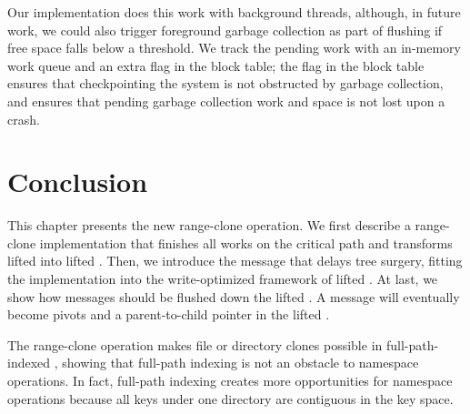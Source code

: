 Our \bedag implementation does this work with background threads,
although, in future work, we could also trigger foreground garbage collection
as part of flushing if free space falls below a threshold.
We track the pending work with an in-memory work queue and an extra flag in the block table;
the flag in the block table ensures that checkpointing the system is not obstructed by garbage collection,
and ensures that pending garbage collection work and space is not lost upon a crash.

\section{Conclusion}

This chapter presents the new range-clone operation.
We first describe a range-clone implementation that finishes all works
on the critical path and transforms lifted \bets into lifted \bedags.
Then, we introduce the \goto message that delays tree surgery,
fitting the implementation into the write-optimized framework of lifted \bedags.
At last, we show how \goto messages should be flushed down the lifted \bedags.
A \goto message will eventually become pivots and a parent-to-child pointer
in the lifted \bedag.

The range-clone operation makes file or directory clones possible in
full-path-indexed \betrfs,
showing that full-path indexing is not an obstacle to namespace operations.
In fact, full-path indexing creates more opportunities for namespace operations
because all keys under one directory are contiguous in the key space.

